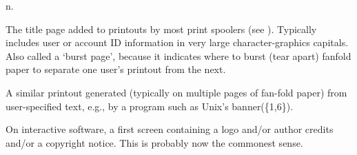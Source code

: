  n.

\begin{inparaenum}
    \item The title page added to printouts by most print spoolers (see
        ). Typically includes user or account ID information in
        very large character-graphics capitals. Also called a `burst page',
        because it indicates where to burst (tear apart) fanfold paper to
        separate one user's printout from the next.
    \item A similar printout generated (typically on multiple pages of fan-fold
        paper) from user-specified text, e.g., by a program such as Unix's
        banner(\{1,6\}).
    \item On interactive software, a first screen containing a logo and/or
        author credits and/or a copyright notice. This is probably now the
        commonest sense.
\end{inparaenum}

